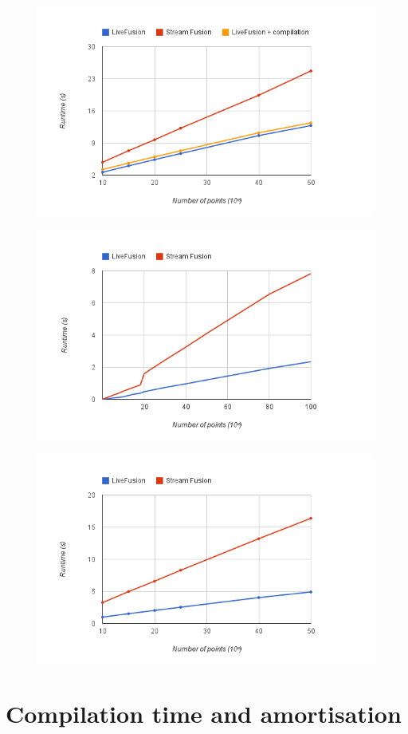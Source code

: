 \documentclass[preamble.tex]{subfiles}
\begin{document}
\begin{figure}
\includegraphics[center]{img/Eval-QuickHull}
\end{figure}

\begin{figure}
\includegraphics[center]{img/Eval-FarAndAboves}
\end{figure}

\begin{figure}
\includegraphics[center]{img/Eval-FarAndAboves-Overall}
\end{figure}

\clearpage
\section{Compilation time and amortisation}


\IfNotCompilingAll{}
\end{document}
